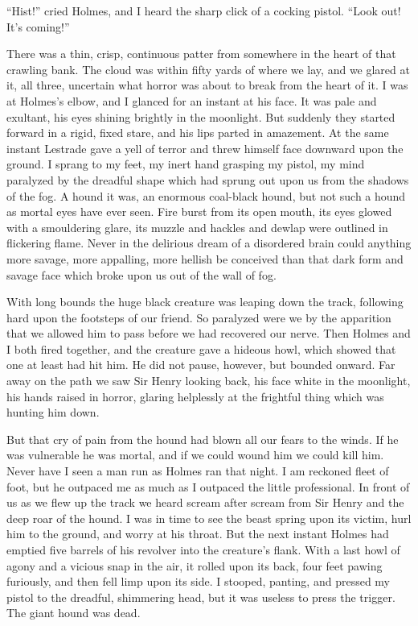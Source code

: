 \documentclass[paper=5.5in:8.5in,BCOR=7mm,twoside,DIV=calc,12pt,usegeometry,openany,chapterprefix,endperiod,headings=big]{scrbook} %
\begin{document}
\enquote{Hist!} cried Holmes, and I heard the sharp click of a cocking pistol. \enquote{Look out! It's coming!}

There was a thin, crisp, continuous patter from somewhere in the heart of that crawling bank. The cloud was within fifty yards of where we lay, and we glared at it, all three, uncertain what horror was about to break from the heart of it. I was at Holmes's elbow, and I glanced for an instant at his face. It was pale and exultant, his eyes shining brightly in the moonlight. But suddenly they started forward in a rigid, fixed stare, and his lips parted in amazement. At the same instant Lestrade gave a yell of terror and threw himself face downward upon the ground. I sprang to my feet, my inert hand grasping my pistol, my mind paralyzed by the dreadful shape which had sprung out upon us from the shadows of the fog. A hound it was, an enormous coal-black hound, but not such a hound as mortal eyes have ever seen. Fire burst from its open mouth, its eyes glowed with a smouldering glare, its muzzle and hackles and dewlap were outlined in flickering flame. Never in the delirious dream of a disordered brain could anything more savage, more appalling, more hellish be conceived than that dark form and savage face which broke upon us out of the wall of fog.

With long bounds the huge black creature was leaping down the track, following hard upon the footsteps of our friend. So paralyzed were we by the apparition that we allowed him to pass before we had recovered our nerve. Then Holmes and I both fired together, and the creature gave a hideous howl, which showed that one at least had hit him. He did not pause, however, but bounded onward. Far away on the path we saw Sir Henry looking back, his face white in the moonlight, his hands raised in horror, glaring helplessly at the frightful thing which was hunting him down.

But that cry of pain from the hound had blown all our fears to the winds. If he was vulnerable he was mortal, and if we could wound him we could kill him. Never have I seen a man run as Holmes ran that night. I am reckoned fleet of foot, but he outpaced me as much as I outpaced the little professional. In front of us as we flew up the track we heard scream after scream from Sir Henry and the deep roar of the hound. I was in time to see the beast spring upon its victim, hurl him to the ground, and worry at his throat. But the next instant Holmes had emptied five barrels of his revolver into the creature's flank. With a last howl of agony and a vicious snap in the air, it rolled upon its back, four feet pawing furiously, and then fell limp upon its side. I stooped, panting, and pressed my pistol to the dreadful, shimmering head, but it was useless to press the trigger. The giant hound was dead.
\end{document}
